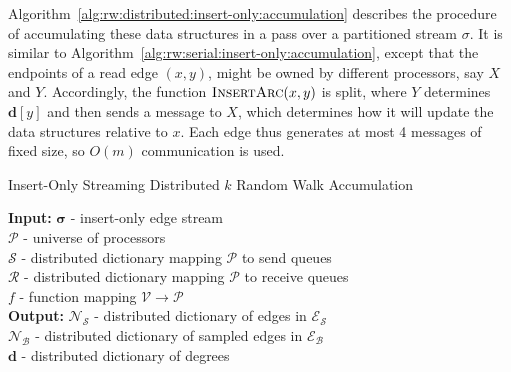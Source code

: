 \documentclass[10]{report}
\newcommand{\algoname}[1]{\textnormal{\textsc{#1}}}
\begin{document}
Algorithm~\ref{alg:rw:distributed:insert-only:accumulation} describes the procedure of accumulating these data structures in a pass over a partitioned stream $\sigma$.
It is similar to Algorithm~\ref{alg:rw:serial:insert-only:accumulation}, except that the endpoints of a read edge $(x, y)$, might be owned by different processors, say $X$ and $Y$.
Accordingly, the function $\algoname{InsertArc}(x,y)$ is split, where $Y$ determines $\mathbf{d}[y]$ and then sends a message to $X$, which determines how it will update the data structures relative to $x$. 
Each edge thus generates at most 4 messages of fixed size, so $O(m)$ communication is used.


\begin{algorithm}[htbp] 
\caption{Insert-Only Streaming Distributed $k$ Random Walk Accumulation}\label{alg:rw:distributed:insert-only:accumulation}
\begin{flushleft}
        \textbf{Input:} 		$\boldsymbol{\sigma}$ - insert-only edge stream\\
        	\hspace{3.2em}	$\mathcal{P}$ - universe of processors	 \\
        	\hspace{3.2em}	$\mathcal{S}$ - distributed dictionary mapping $\mathcal{P}$ to send queues	 \\
        	\hspace{3.2em}	$\mathcal{R}$ - distributed dictionary mapping $\mathcal{P}$ to receive queues	 \\
        	\hspace{3.2em}	$f$ - function mapping $\mathcal{V} \rightarrow \mathcal{P}$	 \\
        \textbf{Output:} $\mathcal{N}_\mathcal{S}$ - distributed dictionary of edges in $\mathcal{E}_\mathcal{S}$ \\
        	\hspace{4.05em}	$\mathcal{N}_\mathcal{B}$ - distributed dictionary of sampled edges in $\mathcal{E}_\mathcal{B}$ \\
        	\hspace{4.05em}	$\mathbf{d}$ - distributed dictionary of degrees
\end{flushleft}
\begin{flushleft}

\end{flushleft}
\end{algorithm}
\end{document}
